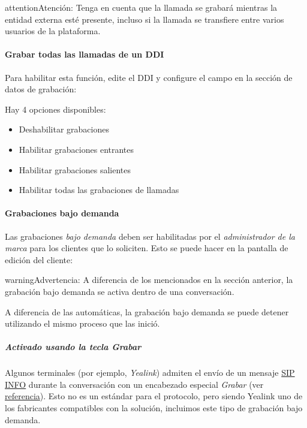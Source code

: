 \documentclass[letterpaper,10pt,spanish]{sphinxmanual}
\begin{document}
\begin{notice}{attention}{Atención:}
Tenga en cuenta que la llamada se grabará mientras la entidad externa esté presente, incluso si la llamada se transfiere entre varios usuarios de la plataforma.
\end{notice}
\paragraph{Grabar todas las llamadas de un DDI}

Para habilitar esta función, edite el DDI y configure el campo en la sección de datos de grabación:

Hay 4 opciones disponibles:
\begin{itemize}
\item {} 
Deshabilitar grabaciones

\item {} 
Habilitar grabaciones entrantes

\item {} 
Habilitar grabaciones salientes

\item {} 
Habilitar todas las grabaciones de llamadas

\end{itemize}


\paragraph{Grabaciones bajo demanda}
\label{administration_portal/client/vpbx/calls/call_recordings:on-demand-recordings}
Las grabaciones \emph{bajo demanda} deben ser habilitadas por el \emph{administrador de la marca} para los clientes que lo soliciten. Esto se puede hacer en la pantalla de edición del cliente:

\begin{notice}{warning}{Advertencia:}
A diferencia de los {\hyperref[administration_portal/client/vpbx/services:services]{}} mencionados en la sección anterior, la grabación bajo demanda se activa dentro de una conversación.
\end{notice}

A diferencia de las automáticas, la grabación bajo demanda se puede detener utilizando el mismo proceso que las inició.


\subparagraph{Activado usando la tecla \emph{Grabar}}
\label{administration_portal/client/vpbx/calls/call_recordings:activated-using-the-record-key}
Algunos terminales (por ejemplo, \emph{Yealink}) admiten el envío de un mensaje \href{https://tools.ietf.org/html/rfc6086}{SIP INFO} durante la conversación con un encabezado especial \emph{Grabar} (ver \href{http://www.yealink.com/Upload/document/UsingCallRecordingFeatureonYealinkPhones/UsingCallRecordingFeatureonYealinkSIPT2XPphonesRev\_610-20561729764.pdf}{referencia}). Esto no es un estándar para el protocolo, pero siendo Yealink uno de los fabricantes compatibles con la solución, incluimos este tipo de grabación bajo demanda.
\end{document}
